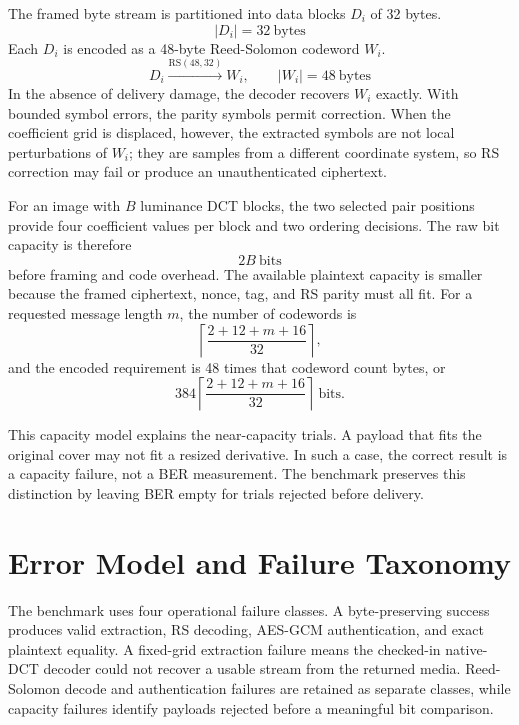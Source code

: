 \documentclass[conference]{IEEEtran}
\newcommand{\safeSection}[1]{\Needspace{5\baselineskip}\section{#1}}
\begin{document}
The framed byte stream is partitioned into data blocks $D_i$ of 32 bytes.
\begin{equation}
|D_i|=32\ \text{bytes}
\end{equation}
Each $D_i$ is encoded as a 48-byte Reed-Solomon codeword $W_i$.
\begin{equation}
D_i\xrightarrow{\mathrm{RS}(48,32)}W_i,\qquad |W_i|=48\ \text{bytes}
\end{equation}
In the absence of delivery damage, the decoder recovers $W_i$ exactly. With bounded symbol errors, the parity symbols permit correction. When the coefficient grid is displaced, however, the extracted symbols are not local perturbations of $W_i$; they are samples from a different coordinate system, so RS correction may fail or produce an unauthenticated ciphertext.

For an image with $B$ luminance DCT blocks, the two selected pair positions provide four coefficient values per block and two ordering decisions. The raw bit capacity is therefore
\begin{equation}
2B\ \text{bits}
\end{equation}
before framing and code overhead. The available plaintext capacity is smaller because the framed ciphertext, nonce, tag, and RS parity must all fit. For a requested message length $m$, the number of codewords is
\begin{equation}
\left\lceil\frac{2+12+m+16}{32}\right\rceil,
\end{equation}
and the encoded requirement is 48 times that codeword count bytes, or
\begin{equation}
384\left\lceil\frac{2+12+m+16}{32}\right\rceil\ \text{bits}.
\end{equation}

This capacity model explains the near-capacity trials. A payload that fits the original cover may not fit a resized derivative. In such a case, the correct result is a capacity failure, not a BER measurement. The benchmark preserves this distinction by leaving BER empty for trials rejected before delivery.

\safeSection{Error Model and Failure Taxonomy}
The benchmark uses four operational failure classes. A byte-preserving success produces valid extraction, RS decoding, AES-GCM authentication, and exact plaintext equality. A fixed-grid extraction failure means the checked-in native-DCT decoder could not recover a usable stream from the returned media. Reed-Solomon decode and authentication failures are retained as separate classes, while capacity failures identify payloads rejected before a meaningful bit comparison.
\end{document}
